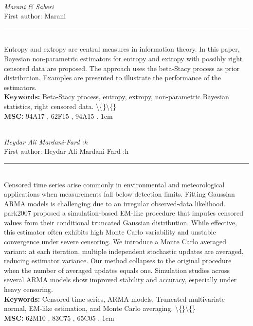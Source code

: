 \documentclass[10pt,twoside]{article}
\begin{document}
\noindent\begin{minipage}[t][\textheight]{\textwidth}
\\[0.35em]
{\itshape Marani \& Saberi}\\[0.2em]
{\footnotesize First author: Marani}\\[0.45em]
\noindent\rule{\textwidth}{0.3pt}\\[0.4em]
{\footnotesize  Entropy and extropy are central measures in information theory. In this paper, Bayesian non-parametric estimators for entropy and extropy with possibly right censored data are proposed. The approach uses the beta-Stacy process as prior distribution. Examples are presented to illustrate the performance of the estimators.}\\[0.4em]
{\footnotesize\bfseries Keywords:} {\footnotesize Beta-Stacy process, entropy, extropy, non-parametric Bayesian statistics, right censored data. \textbackslash\{\}\textbackslash\{\}}\\[0.15em]
{\footnotesize\bfseries MSC:} {\footnotesize 94A17 , 62F15 , 94A15 . 1cm}\\
\vfill
\end{minipage}
\newpage

\noindent\begin{minipage}[t][\textheight]{\textwidth}
\\[0.35em]
{\itshape Heydar Ali Mardani-Fard :h}\\[0.2em]
{\footnotesize First author: Heydar Ali Mardani-Fard :h}\\[0.45em]
\noindent\rule{\textwidth}{0.3pt}\\[0.4em]
{\footnotesize  Censored time series arise commonly in environmental and meteorological applications when measurements fall below detection limits. Fitting Gaussian ARMA models is challenging due to an irregular observed-data likelihood. park2007 proposed a simulation-based EM-like procedure that imputes censored values from their conditional truncated Gaussian distribution. While effective, this estimator often exhibits high Monte Carlo variability and unstable convergence under severe censoring. We introduce a Monte Carlo averaged variant: at each iteration, multiple independent stochastic updates are averaged, reducing estimator variance. Our method collapses to the original procedure when the number of averaged updates equals one. Simulation studies across several ARMA models show improved stability and accuracy, especially under heavy censoring.}\\[0.4em]
{\footnotesize\bfseries Keywords:} {\footnotesize Censored time series, ARMA models, Truncated multivariate normal, EM-like estimation, and Monte Carlo averaging. \textbackslash\{\}\textbackslash\{\}}\\[0.15em]
{\footnotesize\bfseries MSC:} {\footnotesize 62M10 , 83C75 , 65C05 . 1cm}\\
\vfill
\end{minipage}
\newpage
\end{document}
